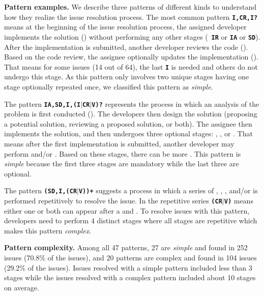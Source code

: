 

\textbf{Pattern examples.} We describe three patterns of different kinds to understand how they realize the issue resolution process. The most common pattern {\texttt{\textbf{I,CR,I?}}} means at the beginning of the issue resolution process, the assigned developer implements the solution (\impl) without performing any other stages (\eg ~{\texttt{\textbf{IR}} or \texttt{\textbf{IA}} or \texttt{\textbf{SD}}}). After the implementation is submitted, another developer reviews the code (\crv). Based on the code review, the assignee optionally  updates the implementation (\impl). That means for some issues (14 out of 64), the last \texttt{\textbf{I}} is needed and others do not undergo this stage. As this pattern only involves two unique stages having one stage optionally repeated once, we classified this pattern as \textit{simple}.

The pattern \texttt{\textbf{IA,SD,I,(I$\mid$CR$\mid$V)?}} represents the process in which an analysis  of the problem is first conducted (\ia). The developers then design the solution (proposing a potential solution, reviewing a proposed solution, or both). The assignee then implements the solution, and then undergoes three optional stages: \impl, \crv, or \ver. That means after the first implementation is submitted, another developer may perform \crv and/or \ver. Based on these stages, there can be more \impl. This pattern is  \textit{simple} because the first three stages are mandatory while the last three are optional.

The pattern {\texttt{\textbf{(SD,I,(CR$\mid$V))+}}} suggests a process in which a series of \sd, \impl, \crv, and/or \ver is performed repetitively to resolve the issue. In the repetitive series {\texttt{\textbf{(CR$\mid$V)}}} means either one or both can appear after a \sd and \impl. To resolve issues with this pattern, developers need to perform 4 distinct stages where all stages are repetitive which makes this pattern \textit{complex}.



\textbf{Pattern complexity.} Among all 47 patterns, 27 are \textit{simple} and found in 252 issues (70.8\% of the issues), and 20 patterns are complex and found in 104 issues (29.2\% of the issues). Issues resolved with a simple pattern included less than 3 stages while the issues resolved with a complex pattern included about 10 stages on average.

